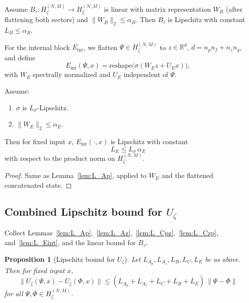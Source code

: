 \documentclass[11pt]{article}
\theoremstyle{definition}
\theoremstyle{plain}
\newtheorem{proposition}{Proposition}
\begin{document}
Assume $B_\tau:H_\zeta^{(N,M)}\to H_\zeta^{(N,M)}$ is linear with matrix representation $W_B$ (after flattening both sectors) and $\|W_B\|_2 \le \alpha_B$.
Then $B_\tau$ is Lipschitz with constant $L_B\le\alpha_B$.

For the internal block $E_{\mathrm{int}}$, we flatten $\Psi\in H_\zeta^{(N,M)}$ to $z\in\mathbb{R}^{d}$, $d=n_p n_f + n_z n_g$, and define
\[
  E_{\mathrm{int}}(\Psi,x)
  = \mathrm{reshape}\bigl(\sigma(W_E z + U_E x)\bigr),
\]
with $W_E$ spectrally normalized and $U_E$ independent of $\Psi$.

\begin{lemma}\label{lem:L_Eint}
Assume:
\begin{enumerate}[label=(\roman*), leftmargin=*]
  \item $\sigma$ is $L_\sigma$-Lipschitz.
  \item $\|W_E\|_2\le\alpha_E$.
\end{enumerate}
Then for fixed input $x$, $E_{\mathrm{int}}(\cdot,x)$ is Lipschitz with constant
\[
  L_E \le L_\sigma\,\alpha_E
\]
with respect to the product norm on $H_\zeta^{(N,M)}$.
\end{lemma}

\begin{proof}
Same as Lemma~\ref{lem:L_Ap}, applied to $W_E$ and the flattened concatenated state.
\end{proof}

\subsection{Combined Lipschitz bound for \texorpdfstring{$U_\zeta$}{Uζ}}

Collect Lemmas~\ref{lem:L_Ap},~\ref{lem:L_Az},~\ref{lem:L_Cpz},~\ref{lem:L_Czp}, and~\ref{lem:L_Eint}, and the linear bound for $B_\tau$.

\begin{proposition}[Lipschitz bound for $U_\zeta$]\label{prop:L_Uzeta}
Let $L_{A_p},L_{A_z},L_B,L_C,L_E$ be as above.
Then for fixed input $x$,
\[
  \|U_\zeta(\Psi,x) - U_\zeta(\Phi,x)\|
  \le
  (L_{A_p} + L_{A_z} + L_C + L_B + L_E)\,\|\Psi - \Phi\|
\]
for all $\Psi,\Phi \in H_\zeta^{(N,M)}$.
\end{proposition}
\end{document}

